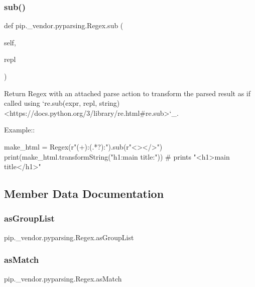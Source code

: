 \subsubsection{\texorpdfstring{sub()}{sub()}}
{\footnotesize\ttfamily def pip.\+\_\+vendor.\+pyparsing.\+Regex.\+sub (\begin{DoxyParamCaption}\item[{}]{self,  }\item[{}]{repl }\end{DoxyParamCaption})}

\begin{DoxyVerb}Return Regex with an attached parse action to transform the parsed
result as if called using `re.sub(expr, repl, string) <https://docs.python.org/3/library/re.html#re.sub>`_.

Example::

    make_html = Regex(r"(\w+):(.*?):").sub(r"<\1>\2</\1>")
    print(make_html.transformString("h1:main title:"))
    # prints "<h1>main title</h1>"
\end{DoxyVerb}
 

\subsection{Member Data Documentation}
\mbox{\label{classpip_1_1__vendor_1_1pyparsing_1_1Regex_af54627850828eeff5296f812ce4b3b0a}} 
\subsubsection{\texorpdfstring{as\+Group\+List}{asGroupList}}
{\footnotesize\ttfamily pip.\+\_\+vendor.\+pyparsing.\+Regex.\+as\+Group\+List}

\mbox{\label{classpip_1_1__vendor_1_1pyparsing_1_1Regex_aa0a6717ee54d3490717b6674554e68a5}} 
\subsubsection{\texorpdfstring{as\+Match}{asMatch}}
{\footnotesize\ttfamily pip.\+\_\+vendor.\+pyparsing.\+Regex.\+as\+Match}


